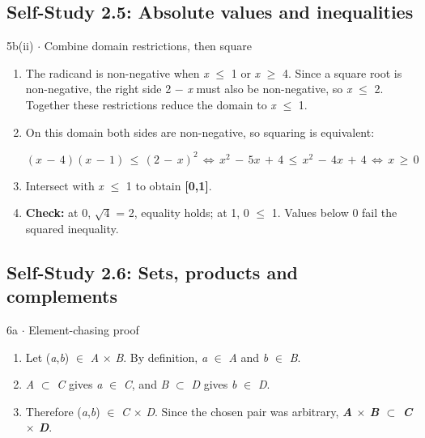 \documentclass[11pt]{article}
\begin{document}
\begin{keepsection}\subsection{Self-Study 2.5: Absolute values and inequalities}

\begin{workedbox}{5b(ii) \ensuremath{\cdot} Combine domain restrictions, then square}
\begin{enumerate}
\item The radicand is non-negative when \textit{x} \ensuremath{\leq} 1 or \textit{x} \ensuremath{\geq} 4. Since a square root is non-negative, the right side 2 \ensuremath{-} \textit{x} must also be non-negative, so \textit{x} \ensuremath{\leq} 2. Together these restrictions reduce the domain to \textit{x} \ensuremath{\leq} 1.
\item {}
On this domain both sides are non-negative, so squaring is equivalent:

\begin{equation*}({x}\, -\, 4)({x}\, -\, 1)\, \leq \, (2\, -\, {x})^{2}\, \Leftrightarrow \, {x}^{2}\, -\, 5{x}\, +\, 4\, \leq \, {x}^{2}\, -\, 4{x}\, +\, 4\, \Leftrightarrow \, {x}\, \geq \, 0\end{equation*}
\item Intersect with \textit{x} \ensuremath{\leq} 1 to obtain \textbf{[0,1]}.
\item \textbf{Check:} at 0, \ensuremath{\sqrt{4}} = 2, equality holds; at 1, 0 \ensuremath{\leq} 1. Values below 0 fail the squared inequality.
\end{enumerate}
\end{workedbox}

\end{keepsection}
\begin{keepsection}\subsection{Self-Study 2.6: Sets, products and complements}

\begin{workedbox}{6a \ensuremath{\cdot} Element-chasing proof}
\begin{enumerate}
\item Let (\textit{a},\textit{b}) \ensuremath{\in} \textit{A} \ensuremath{\times} \textit{B}. By definition, \textit{a} \ensuremath{\in} \textit{A} and \textit{b} \ensuremath{\in} \textit{B}.
\item \textit{A} \ensuremath{\subset} \textit{C} gives \textit{a} \ensuremath{\in} \textit{C}, and \textit{B} \ensuremath{\subset} \textit{D} gives \textit{b} \ensuremath{\in} \textit{D}.
\item Therefore (\textit{a},\textit{b}) \ensuremath{\in} \textit{C} \ensuremath{\times} \textit{D}. Since the chosen pair was arbitrary, \textbf{\textit{A} \ensuremath{\times} \textit{B} \ensuremath{\subset} \textit{C} \ensuremath{\times} \textit{D}}.
\end{enumerate}
\end{workedbox}

\end{keepsection}
\end{document}
